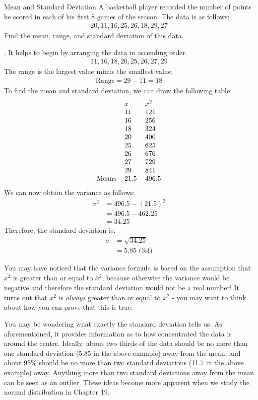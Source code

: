\documentclass[../../main.tex]{subfiles}
\begin{document}
\begin{example}{Mean and Standard Deviation}
A basketball player recorded the number of points he scored in each of his first 8 games of the season. The data is as follows:
\begin{align}
    20, 11, 16, 25, 26, 18, 29, 27
\end{align}
Find the mean, range, and standard deviation of this data.

\sep
It helps to begin by arranging the data in ascending order.
\begin{align}
    11, 16, 18, 20, 25, 26, 27, 29
\end{align}
The range is the largest value minus the smallest value.
\begin{align}
    \text{Range} = 29 - 11 = 18
\end{align}
To find the mean and standard deviation, we can draw the following table:
\begin{align}
\begin{tabular}{lll}
 & $x$ & $x^2$ \\
 & 11 & 121 \\
 & 16 & 256 \\
 & 18 & 324 \\
 & 20 & 400 \\
 & 25 & 625 \\
 & 26 & 676 \\
 & 27 & 729 \\
 & 29 & 841 \\
Means & 21.5 & 496.5
\end{tabular}
\end{align}
We can now obtain the variance as follows:
\begin{align}
    \sigma^2 &= 496.5 - (21.5)^2 \\
    &= 496.5 - 462.25 \\
    &= 34.25
\end{align}
Therefore, the standard deviation is:
\begin{align}
    \sigma &= \sqrt{34.25} \\
    &= 5.85 \text{ (3sf)}
\end{align}
\subtitle{Insight}
You may have noticed that the variance formula is based on the assumption that $\overline{x^2}$ is greater than or equal to $\bar{x}^2$, because otherwise the variance would be negative and therefore the standard deviation would not be a real number! It turns out that $\overline{x^2}$ is \textit{always} greater than or equal to $\bar{x}^2$ - you may want to think about how you can prove that this is true.
\end{example}
You may be wondering what exactly the standard deviation tells us. As aforementioned, it provides information as to how concentrated the data is around the centre. Ideally, about two thirds of the data should be no more than one standard deviation (5.85 in the above example) away from the mean, and about 95\% should be no more than two standard deviations (11.7 in the above example) away. Anything more than two standard deviations away from the mean can be seen as an outlier. These ideas become more apparent when we study the normal distribution in Chapter 19.
\end{document}
